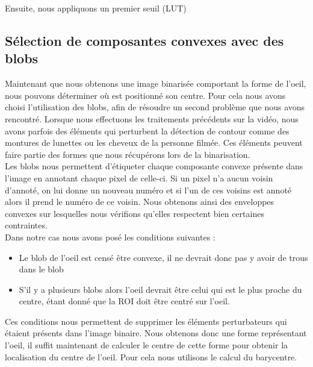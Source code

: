 Ensuite, nous appliquons un premier seuil (LUT)

\subsection{Sélection de composantes convexes avec des blobs}
Maintenant que nous obtenons une image binarisée comportant la forme de l'oeil, nous pouvons déterminer où est
positionné son centre. Pour cela nous avons choisi l'utilisation des blobs, afin de résoudre un second 
problème que nous avons rencontré. Lorsque nous effectuons les traitements précédents sur la vidéo, nous avons
parfois des éléments qui perturbent la détection de contour comme des montures de lunettes ou les cheveux de la personne 
filmée. Ces éléments peuvent faire partie des formes que nous récupérons lors de la binarisation.\\ 

Les blobs nous permettent d'étiqueter chaque composante convexe présente dans l'image en annotant
chaque pixel de celle-ci. Si un pixel n'a aucun voisin d'annoté, on lui donne un nouveau numéro et si
l'un de ces voisins est annoté alors il prend le numéro de ce voisin. Nous obtenons ainsi des enveloppes
convexes sur lesquelles nous vérifions qu'elles respectent bien certaines contraintes.\\

Dans notre cas nous avons posé les conditions suivantes :
\begin{itemize}
 \item Le blob de l'oeil est censé être convexe, il ne devrait donc pas y avoir de trous dans le blob
 \item S'il y a plusieurs blobs alors l'oeil devrait être celui qui est le plus proche du centre, étant
 donné que la ROI doit être centré sur l'oeil.
\end{itemize}
Ces conditions nous permettent de supprimer les éléments perturbateurs qui étaient présents dans l'image binaire.
Nous obtenons donc une forme représentant l'oeil, il suffit maintenant de calculer le centre de cette forme
pour obtenir la localisation du centre de l'oeil. Pour cela nous utilisons le calcul du barycentre.